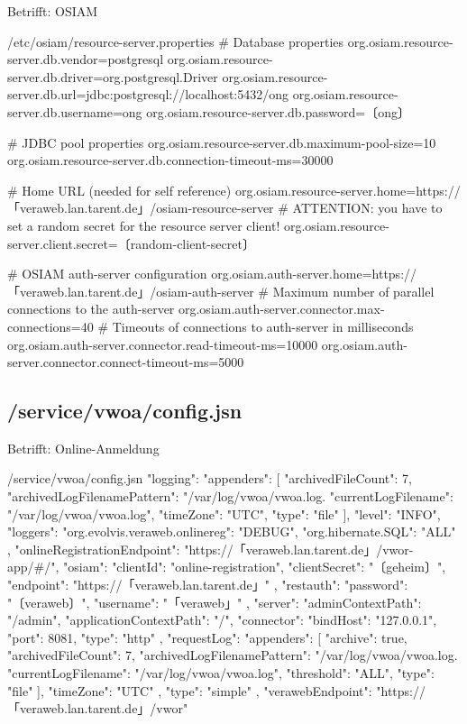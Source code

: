 \documentclass{tarentanleitung}
\begin{document}
Betrifft: OSIAM

\begin{lstdump}{/etc/osiam/resource-server.properties}
# Database properties
org.osiam.resource-server.db.vendor=postgresql
org.osiam.resource-server.db.driver=org.postgresql.Driver
org.osiam.resource-server.db.url=jdbc:postgresql://localhost:5432/ong
org.osiam.resource-server.db.username=ong
org.osiam.resource-server.db.password=〔ong〕

# JDBC pool properties
org.osiam.resource-server.db.maximum-pool-size=10
org.osiam.resource-server.db.connection-timeout-ms=30000

# Home URL (needed for self reference)
org.osiam.resource-server.home=https://「veraweb.lan.tarent.de」/osiam-resource-server
# ATTENTION: you have to set a random secret for the resource server client!
org.osiam.resource-server.client.secret=〔random-client-secret〕

# OSIAM auth-server configuration
org.osiam.auth-server.home=https://「veraweb.lan.tarent.de」/osiam-auth-server
# Maximum number of parallel connections to the auth-server
org.osiam.auth-server.connector.max-connections=40
# Timeouts of connections to auth-server in milliseconds
org.osiam.auth-server.connector.read-timeout-ms=10000
org.osiam.auth-server.connector.connect-timeout-ms=5000
\end{lstdump}

\subsection{/service/vwoa/config.jsn}\label{subsec:refcfg-oa-cfg}

Betrifft: Online-Anmeldung

\begin{lstdump}{/service/vwoa/config.jsn}
{
  "logging": {
    "appenders": [
      {
        "archivedFileCount": 7,
        "archivedLogFilenamePattern": "/var/log/vwoa/vwoa.log.%
        "currentLogFilename": "/var/log/vwoa/vwoa.log",
        "timeZone": "UTC",
        "type": "file"
      }
    ],
    "level": "INFO",
    "loggers": {
      "org.evolvis.veraweb.onlinereg": "DEBUG",
      "org.hibernate.SQL": "ALL"
    }
  },
  "onlineRegistrationEndpoint": "https://「veraweb.lan.tarent.de」/vwor-app/#/",
  "osiam": {
    "clientId": "online-registration",
    "clientSecret": "〔geheim〕",
    "endpoint": "https://「veraweb.lan.tarent.de」"
  },
  "restauth": {
    "password": "〔veraweb〕",
    "username": "「veraweb」"
  },
  "server": {
    "adminContextPath": "/admin",
    "applicationContextPath": "/",
    "connector": {
      "bindHost": "127.0.0.1",
      "port": 8081,
      "type": "http"
    },
    "requestLog": {
      "appenders": [
        {
          "archive": true,
          "archivedFileCount": 7,
          "archivedLogFilenamePattern": "/var/log/vwoa/vwoa.log.%
          "currentLogFilename": "/var/log/vwoa/vwoa.log",
          "threshold": "ALL",
          "type": "file"
        }
      ],
      "timeZone": "UTC"
    },
    "type": "simple"
  },
  "verawebEndpoint": "https://「veraweb.lan.tarent.de」/vwor"
}
\end{lstdump}
\end{document}
